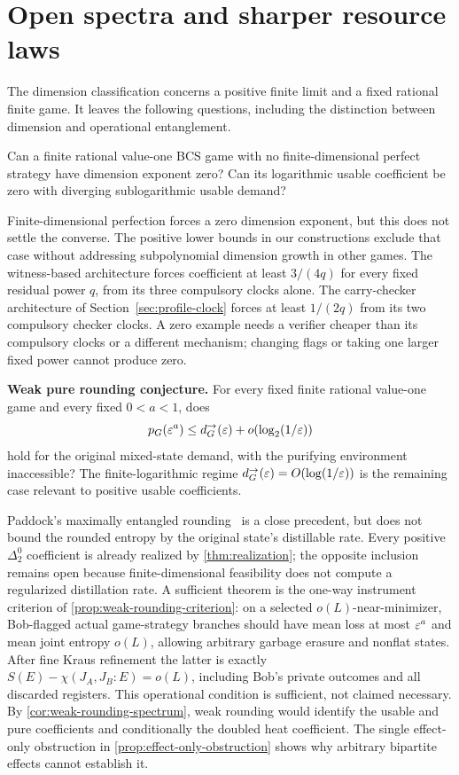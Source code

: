 \section{Open spectra and sharper resource laws}\label{sec:problems}
The dimension classification concerns a positive finite limit and a fixed rational finite game. It leaves the following questions, including the distinction between dimension and operational entanglement.

\begin{problem}\label{prob:zero}
Can a finite rational value-one BCS game with no finite-dimensional perfect strategy have dimension exponent zero? Can its logarithmic usable coefficient be zero with diverging sublogarithmic usable demand?
\end{problem}
Finite-dimensional perfection forces a zero dimension exponent, but this does not settle the converse. The positive lower bounds in our constructions exclude that case without addressing subpolynomial dimension growth in other games. The witness-based architecture forces coefficient at least $3/(4q)$ for every fixed residual power $q$, from its three compulsory clocks alone. The carry-checker architecture of Section~\ref{sec:profile-clock} forces at least $1/(2q)$ from its two compulsory checker clocks. A zero example needs a verifier cheaper than its compulsory clocks or a different mechanism; changing flags or taking one larger fixed power cannot produce zero.

\begin{problem}\label{prob:usable-spectrum}
\textbf{Weak pure rounding conjecture.} For every fixed finite rational value-one game and every fixed $0<a<1$, does
\[
 p_G(\varepsilon^a)\le d_G^\to(\varepsilon)+o(\log_2(1/\varepsilon))
\]
hold for the original mixed-state demand, with the purifying environment inaccessible? The finite-logarithmic regime $d_G^\to(\varepsilon)=O(\log(1/\varepsilon))$ is the remaining case relevant to positive usable coefficients.
\end{problem}
Paddock's maximally entangled rounding~\cite[Corollary~1.3]{Pad22} is a close precedent, but does not bound the rounded entropy by the original state's distillable rate. Every positive $\Delta^0_2$ coefficient is already realized by \cref{thm:realization}; the opposite inclusion remains open because finite-dimensional feasibility does not compute a regularized distillation rate. A sufficient theorem is the one-way instrument criterion of \cref{prop:weak-rounding-criterion}: on a selected $o(L)$-near-minimizer, Bob-flagged actual game-strategy branches should have mean loss at most $\varepsilon^a$ and mean joint entropy $o(L)$, allowing arbitrary garbage erasure and nonflat states. After fine Kraus refinement the latter is exactly $S(E)-\chi(J_A,J_B:E)=o(L)$, including Bob's private outcomes and all discarded registers. This operational condition is sufficient, not claimed necessary. By \cref{cor:weak-rounding-spectrum}, weak rounding would identify the usable and pure coefficients and conditionally the doubled heat coefficient. The single effect-only obstruction in \cref{prop:effect-only-obstruction} shows why arbitrary bipartite effects cannot establish it.

